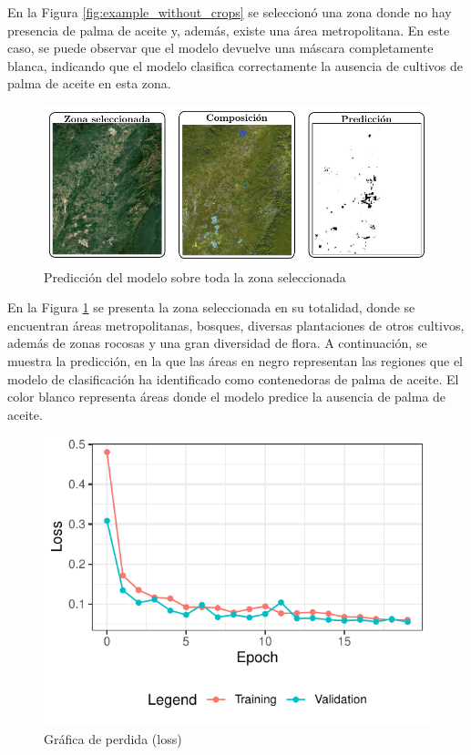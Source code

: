 En la Figura \ref{fig:example_without_crops} se seleccionó una zona donde no hay presencia de palma de aceite y, además, existe una área metropolitana. En este caso, se puede observar que el modelo devuelve una máscara completamente blanca, indicando que el modelo clasifica correctamente la ausencia de cultivos de palma de aceite en esta zona.

\begin{figure}[t]
 \centering
 \includegraphics[width=\textwidth]{full_prediction}
 \caption{Predicción del modelo sobre toda la zona seleccionada}
 \label{fig:full_prediction}
\end{figure}

En la Figura \ref{fig:full_prediction} se presenta la zona seleccionada en su totalidad, donde se encuentran áreas metropolitanas, bosques, diversas plantaciones de otros cultivos, además de zonas rocosas y una gran diversidad de flora. A continuación, se muestra la predicción, en la que las áreas en negro representan las regiones que el modelo de clasificación ha identificado como contenedoras de palma de aceite. El color blanco representa áreas donde el modelo predice la ausencia de palma de aceite.

\begin{figure}
 \centering
 \includegraphics[width=\columnwidth]{loss}
 \caption{Gráfica de perdida (loss)}
 \label{fig:loss}
\end{figure}


